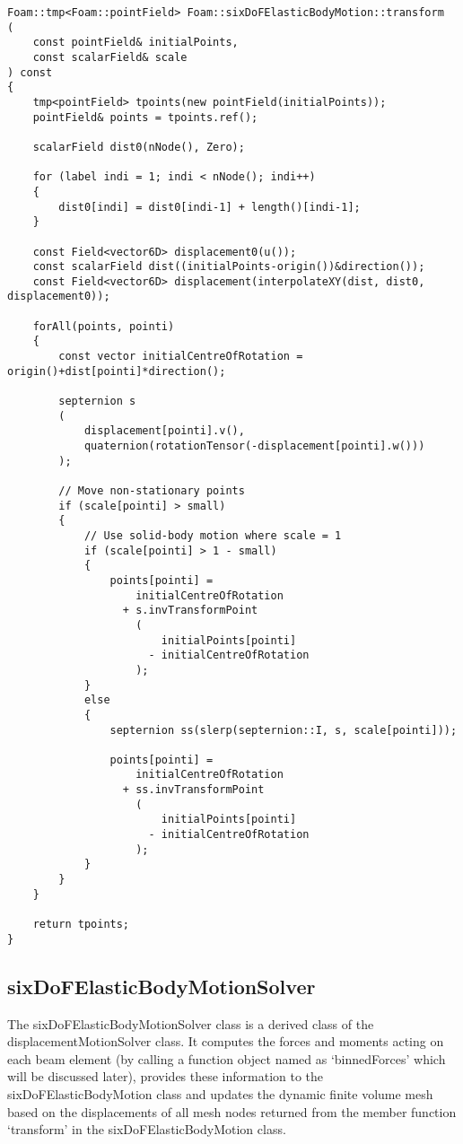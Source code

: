 \begin{lstlisting}
Foam::tmp<Foam::pointField> Foam::sixDoFElasticBodyMotion::transform
(
    const pointField& initialPoints,
    const scalarField& scale
) const
{
    tmp<pointField> tpoints(new pointField(initialPoints));
    pointField& points = tpoints.ref();

    scalarField dist0(nNode(), Zero);

    for (label indi = 1; indi < nNode(); indi++)
    {
        dist0[indi] = dist0[indi-1] + length()[indi-1];
    }

    const Field<vector6D> displacement0(u());
    const scalarField dist((initialPoints-origin())&direction());
    const Field<vector6D> displacement(interpolateXY(dist, dist0, displacement0));

    forAll(points, pointi)
    {
        const vector initialCentreOfRotation = origin()+dist[pointi]*direction();

        septernion s
        (
            displacement[pointi].v(),
            quaternion(rotationTensor(-displacement[pointi].w()))
        );

        // Move non-stationary points
        if (scale[pointi] > small)
        {
            // Use solid-body motion where scale = 1
            if (scale[pointi] > 1 - small)
            {
                points[pointi] =
                    initialCentreOfRotation
                  + s.invTransformPoint
                    (
                        initialPoints[pointi]
                      - initialCentreOfRotation
                    );
            }
            else
            {
                septernion ss(slerp(septernion::I, s, scale[pointi]));

                points[pointi] =
                    initialCentreOfRotation
                  + ss.invTransformPoint
                    (
                        initialPoints[pointi]
                      - initialCentreOfRotation
                    );
            }
        }
    }

    return tpoints;
}
\end{lstlisting}

\subsection{sixDoFElasticBodyMotionSolver}

The sixDoFElasticBodyMotionSolver class is a derived class of the displacementMotionSolver class. It computes the forces and moments acting on each beam element (by calling a function object named as `binnedForces' which will be discussed later), provides these information to the sixDoFElasticBodyMotion class and updates the dynamic finite volume mesh based on the displacements of all mesh nodes returned from the member function `transform' in the sixDoFElasticBodyMotion class.

